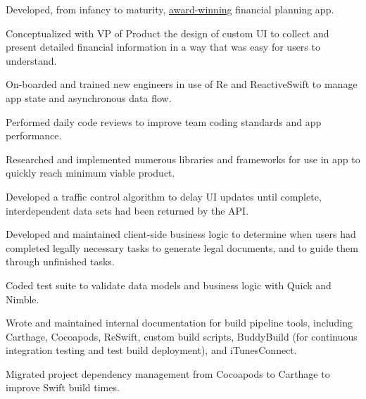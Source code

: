 \documentclass[]{jhearn-resume}
\begin{document}
\begin{minipage}[t]{0.64\textwidth}
\begin{tightemize}
\item Developed, from infancy to maturity, \href{https://tomorrow.me/trust-worthy/tomorrow-news/tomorrow-wins-at-plug-and-play-winter-summit/}{award-winning} financial planning app.
\item Conceptualized with VP of Product the design of custom UI to collect and present detailed financial information in a way that was easy for users to understand. 
\item On-boarded and trained new engineers in use of Re     and ReactiveSwift to manage app state and asynchronous data flow.
\item Performed daily code reviews to improve team coding standards and app performance.
\item Researched and implemented numerous libraries and frameworks for use in app to quickly reach minimum viable product.
\item Developed a traffic control algorithm to delay UI updates until complete, interdependent data sets had been returned by the API.
\item Developed and maintained client-side business logic to determine when users had completed legally necessary tasks to generate legal documents, and to guide them through unfinished tasks.
\item Coded test suite to validate data models and business logic with Quick and Nimble.
\item Wrote and maintained internal documentation for build pipeline tools, including Carthage, Cocoapods, ReSwift, custom build scripts, BuddyBuild (for continuous integration testing and test build deployment), and iTunesConnect.
\item Migrated project dependency management from Cocoapods to Carthage to improve Swift build times.



\end{tightemize}
\end{minipage}
\end{document}
